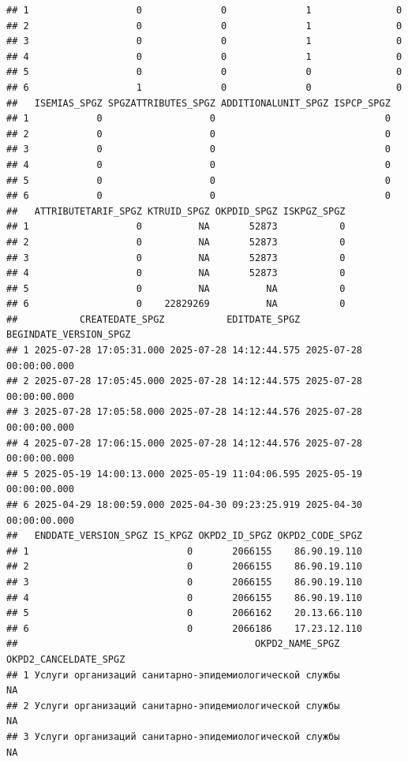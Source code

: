 \documentclass[
]{article}
\begin{document}
\begin{verbatim}
## 1                   0              0              1               0
## 2                   0              0              1               0
## 3                   0              0              1               0
## 4                   0              0              1               0
## 5                   0              0              0               0
## 6                   1              0              0               0
##   ISEMIAS_SPGZ SPGZATTRIBUTES_SPGZ ADDITIONALUNIT_SPGZ ISPCP_SPGZ
## 1            0                   0                              0
## 2            0                   0                              0
## 3            0                   0                              0
## 4            0                   0                              0
## 5            0                   0                              0
## 6            0                   0                              0
##   ATTRIBUTETARIF_SPGZ KTRUID_SPGZ OKPDID_SPGZ ISKPGZ_SPGZ
## 1                   0          NA       52873           0
## 2                   0          NA       52873           0
## 3                   0          NA       52873           0
## 4                   0          NA       52873           0
## 5                   0          NA          NA           0
## 6                   0    22829269          NA           0
##           CREATEDATE_SPGZ           EDITDATE_SPGZ  BEGINDATE_VERSION_SPGZ
## 1 2025-07-28 17:05:31.000 2025-07-28 14:12:44.575 2025-07-28 00:00:00.000
## 2 2025-07-28 17:05:45.000 2025-07-28 14:12:44.575 2025-07-28 00:00:00.000
## 3 2025-07-28 17:05:58.000 2025-07-28 14:12:44.576 2025-07-28 00:00:00.000
## 4 2025-07-28 17:06:15.000 2025-07-28 14:12:44.576 2025-07-28 00:00:00.000
## 5 2025-05-19 14:00:13.000 2025-05-19 11:04:06.595 2025-05-19 00:00:00.000
## 6 2025-04-29 18:00:59.000 2025-04-30 09:23:25.919 2025-04-30 00:00:00.000
##   ENDDATE_VERSION_SPGZ IS_KPGZ OKPD2_ID_SPGZ OKPD2_CODE_SPGZ
## 1                            0       2066155    86.90.19.110
## 2                            0       2066155    86.90.19.110
## 3                            0       2066155    86.90.19.110
## 4                            0       2066155    86.90.19.110
## 5                            0       2066162    20.13.66.110
## 6                            0       2066186    17.23.12.110
##                                          OKPD2_NAME_SPGZ OKPD2_CANCELDATE_SPGZ
## 1 Услуги организаций санитарно-эпидемиологической службы                    NA
## 2 Услуги организаций санитарно-эпидемиологической службы                    NA
## 3 Услуги организаций санитарно-эпидемиологической службы                    NA

\end{verbatim}
\end{document}
